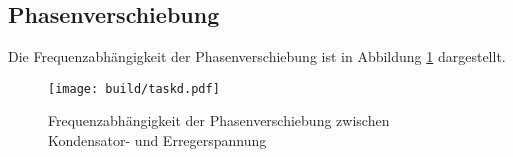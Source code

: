 \subsection{Phasenverschiebung}

Die Frequenzabhängigkeit der Phasenverschiebung ist in Abbildung \ref{fig:phasenplot} dargestellt.

\begin{figure}
	\centering
	\texttt{[image: build/taskd.pdf]}
	\caption{Frequenzabhängigkeit der Phasenverschiebung zwischen Kondensator- und Erregerspannung}
	\label{fig:phasenplot}
\end{figure}
